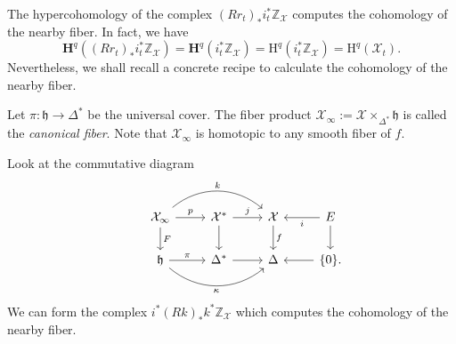 The hypercohomology of the complex \((Rr_{t})_{\ast}i_{t}^{\ast}\mathbb{Z}_{\mathcal{X}}\)
computes the cohomology of the nearby fiber. In fact, we have
\begin{equation*}
    \mathbf{H}^{q}((Rr_{t})_{\ast}i_{t}^{\ast}\mathbb{Z}_{\mathcal{X}})
    = \mathbf{H}^{q}(i_{t}^{\ast}\mathbb{Z}_{\mathcal{X}}) 
    = \mathrm{H}^{q}(i_{t}^{\ast}\mathbb{Z}_{\mathcal{X}})
    = \mathrm{H}^{q}(\mathcal{X}_{t}).
\end{equation*}
Nevertheless, we shall recall a concrete recipe to calculate 
the cohomology of the nearby fiber.

Let \(\pi\colon\mathfrak{h}\to \Delta^{\ast}\) be the universal cover.
The fiber product \(\mathcal{X}_{\infty}:=\mathcal{X}\times_{\Delta^{\ast}}\mathfrak{h}\)
is called the \emph{canonical fiber}. Note that \(\mathcal{X}_{\infty}\)
is homotopic to any smooth fiber of \(f\).

Look at the commutative diagram
\begin{equation*}
    \begin{tikzcd}
        & \mathcal{X}_{\infty} \ar[r,"p"]\ar[d,"F"]\ar[rr,bend left=40,"k"] & \mathcal{X}^{\ast}\ar[r,"j"]\ar[d] &\mathcal{X}\ar[d,"f"] & E\ar[l,"i"]\ar[d]\\
        & \mathfrak{h}\ar[r,"\pi"]\ar[rr,bend right=40,"\kappa"'] &\Delta^{\ast}\ar[r] &\Delta & \{0\}\ar[l].
    \end{tikzcd}
\end{equation*}
We can form the complex \(i^{\ast}(Rk)_{\ast}k^{\ast}\mathbb{Z}_{\mathcal{X}}\)
which computes the cohomology of the nearby fiber.

